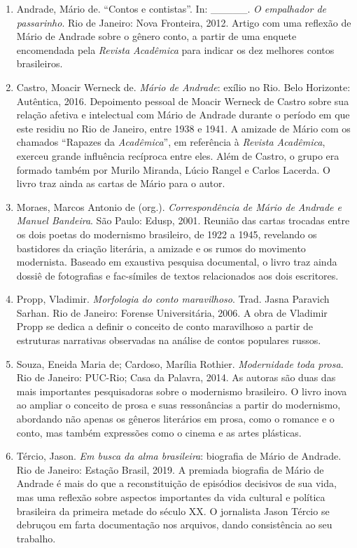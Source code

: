 \documentclass[12pt]{extarticle}
\begin{document}
\begin{enumerate}
\item
  Andrade, Mário de. ``Contos e contistas''. In: \_\_\_\_\_. \emph{O
  empalhador de passarinho}. Rio de Janeiro: Nova Fronteira, 2012.
  Artigo com uma reflexão de Mário de Andrade sobre o gênero conto, a
  partir de uma enquete encomendada pela \emph{Revista Acadêmica} para
  indicar os dez melhores contos brasileiros.
\item
  Castro, Moacir Werneck de. \emph{Mário de Andrade}: exílio no Rio.
  Belo Horizonte: Autêntica, 2016. Depoimento pessoal de Moacir Werneck
  de Castro sobre sua relação afetiva e intelectual com Mário de Andrade
  durante o período em que este residiu no Rio de Janeiro, entre 1938 e
  1941. A amizade de Mário com os chamados ``Rapazes da
  \emph{Acadêmica}'', em referência à \emph{Revista Acadêmica}, exerceu
  grande influência recíproca entre eles. Além de Castro, o grupo era
  formado também por Murilo Miranda, Lúcio Rangel e Carlos Lacerda. O
  livro traz ainda as cartas de Mário para o autor.
\item
  Moraes, Marcos Antonio de (org.). \emph{Correspondência de Mário de
  Andrade e Manuel Bandeira}. São Paulo: Edusp, 2001. Reunião das cartas
  trocadas entre os dois poetas do modernismo brasileiro, de 1922 a
  1945, revelando os bastidores da criação literária, a amizade e os
  rumos do movimento modernista. Baseado em exaustiva pesquisa
  documental, o livro traz ainda dossiê de fotografias e fac-símiles de
  textos relacionados aos dois escritores.
\item
  Propp, Vladimir. \emph{Morfologia do conto maravilhoso}. Trad. Jasna
  Paravich Sarhan. Rio de Janeiro: Forense Universitária, 2006. A obra
  de Vladimir Propp se dedica a definir o conceito de conto maravilhoso
  a partir de estruturas narrativas observadas na análise de contos
  populares russos.
\item
  Souza, Eneida Maria de; Cardoso, Marília Rothier. \emph{Modernidade
  toda prosa}. Rio de Janeiro: PUC-Rio; Casa da Palavra, 2014. As
  autoras são duas das mais importantes pesquisadoras sobre o modernismo
  brasileiro. O livro inova ao ampliar o conceito de prosa e suas
  ressonâncias a partir do modernismo, abordando não apenas os gêneros
  literários em prosa, como o romance e o conto, mas também expressões
  como o cinema e as artes plásticas.
\item
  Tércio, Jason. \emph{Em busca da alma brasileira}: biografia de Mário
  de Andrade. Rio de Janeiro: Estação Brasil, 2019. A premiada biografia
  de Mário de Andrade é mais do que a reconstituição de episódios
  decisivos de sua vida, mas uma reflexão sobre aspectos importantes da
  vida cultural e política brasileira da primeira metade do século XX. O
  jornalista Jason Tércio se debruçou em farta documentação nos
  arquivos, dando consistência ao seu trabalho.
\end{enumerate}
\end{document}
